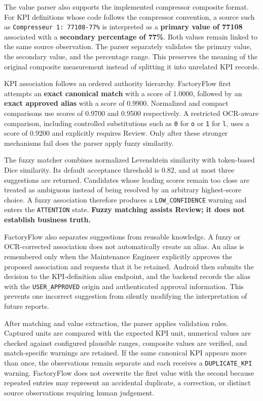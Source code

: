 The value parser also supports the implemented compressor composite format. For KPI definitions whose code follows the compressor convention, a source such as \texttt{Compresseur 1: 77108-77\%} is interpreted as a \textbf{primary value of 77108} associated with a \textbf{secondary percentage of 77\%}. Both values remain linked to the same source observation. The parser separately validates the primary value, the secondary value, and the percentage range. This preserves the meaning of the original composite measurement instead of splitting it into unrelated KPI records.

KPI association follows an ordered authority hierarchy. FactoryFlow first attempts an \textbf{exact canonical match} with a score of 1.0000, followed by an \textbf{exact approved alias} with a score of 0.9900. Normalized and compact comparisons use scores of 0.9700 and 0.9500 respectively. A restricted OCR-aware comparison, including controlled substitutions such as \texttt{0} for \texttt{o} or \texttt{1} for \texttt{l}, uses a score of 0.9200 and explicitly requires Review. Only after these stronger mechanisms fail does the parser apply fuzzy similarity.

The fuzzy matcher combines normalized Levenshtein similarity with token-based Dice similarity. Its default acceptance threshold is 0.82, and at most three suggestions are returned. Candidates whose leading scores remain too close are treated as ambiguous instead of being resolved by an arbitrary highest-score choice. A fuzzy association therefore produces a \texttt{LOW\_CONFIDENCE} warning and enters the \texttt{ATTENTION} state. \textbf{Fuzzy matching assists Review; it does not establish business truth.}

FactoryFlow also separates suggestions from reusable knowledge. A fuzzy or OCR-corrected association does not automatically create an alias. An alias is remembered only when the Maintenance Engineer explicitly approves the proposed association and requests that it be retained. Android then submits the decision to the KPI-definition alias endpoint, and the backend records the alias with the \texttt{USER\_APPROVED} origin and authenticated approval information. This prevents one incorrect suggestion from silently modifying the interpretation of future reports.

After matching and value extraction, the parser applies validation rules. Captured units are compared with the expected KPI unit, numerical values are checked against configured plausible ranges, composite values are verified, and match-specific warnings are retained. If the same canonical KPI appears more than once, the observations remain separate and each receives a \texttt{DUPLICATE\_KPI} warning. FactoryFlow does not overwrite the first value with the second because repeated entries may represent an accidental duplicate, a correction, or distinct source observations requiring human judgement.

